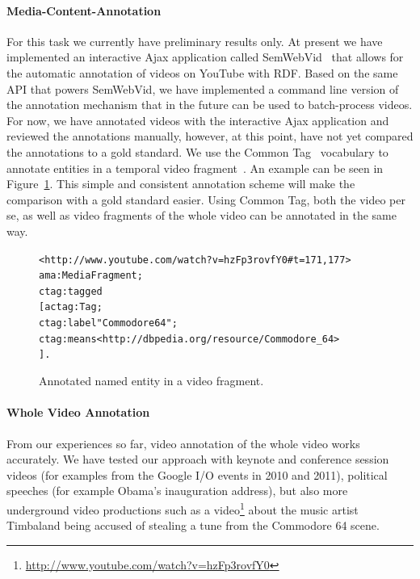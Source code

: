 \documentclass[runningheads,a4paper]{llncs}
\newenvironment{code}[1]
{\begin{lrbox}{\inverbatim}\begin{minipage}{12cm}\begin{alltt}{#1}}
{\end{alltt}\end{minipage}\end{lrbox}\colorbox{lightgray}{\usebox{\inverbatim}}}
\begin{document}
\paragraph{\bf{Media-Content-Annotation}}
For this task we currently have preliminary results only. At present we have implemented an interactive Ajax application called SemWebVid~\cite{semwebvid} that allows for the automatic annotation of videos on YouTube with RDF. Based on the same API that powers SemWebVid, we have implemented a command line version of the annotation mechanism that in the future can be used to batch-process videos. For now, we have annotated videos with the interactive Ajax application and reviewed the annotations manually, however, at this point, have not yet compared the annotations to a gold standard. We use the Common Tag~\cite{CommonTag:Spec} vocabulary to annotate entities in a temporal video fragment~\cite{W3C:MediaFrags}. An example can be seen in Figure~\ref{code:ctag}. This simple and consistent annotation scheme will make the comparison with a gold standard easier. Using Common Tag, both the video per se, as well as video fragments of the whole video can be annotated in the same way.

\begin{figure}[htbp!]
\begin{center}
{\footnotesize
\begin{code}
<http://www. youtube.com/watch?v=hzFp3rovfY0#t=171,177>
  a ma:MediaFragment ;
  ctag:tagged
    [ a ctag:Tag ;
      ctag:label "Commodore 64" ;
      ctag:means <http://dbpedia.org/resource/Commodore_64>
    ] .
\end{code}}
  \caption[Annotated named entity in a video fragment.]{Annotated named entity in a video fragment.}
  \label{code:ctag} 
  \end{center}  
\end{figure}

\paragraph{Whole Video Annotation}
From our experiences so far, video annotation of the whole video works accurately. We have tested our approach with keynote and conference session videos (for examples from the Google I/O events in 2010 and 2011), political speeches (for example Obama's inauguration address), but also more underground video productions such as a video\footnote{\url{http://www.youtube.com/watch?v=hzFp3rovfY0}} about the music artist Timbaland being accused of stealing a tune from the Commodore 64 scene.
\end{document}
